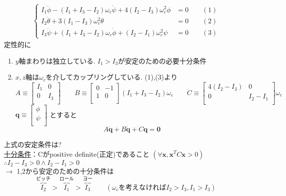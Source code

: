 \documentclass[class=article, crop=false, dvipdfmx, fleqn]{standalone}
\begin{document}
\begin{align}
\begin{cases}
I_1\ddot{\phi}
-(I_1+I_3-I_2)\omega_c\dot{\psi}
+4(I_2-I_3)\omega_c^2
\phi
&=0 \qquad(1)\\
I_2\ddot{\theta}
+3(I_1-I_3)\omega_c^2\theta
&=0 \qquad(2)\\
I_3\ddot{\psi}
+(I_1+I_3-I_2)\omega_c\dot{\phi}
+(I_2-I_1)\omega_c^2\psi
&=0\qquad(3)
\end{cases}
\end{align}
定性的に
\begin{enumerate}
\item $y$軸まわりは独立している.
$I_1 > I_3$が安定のための必要十分条件
\item $x,z$軸は$\omega_c$を介してカップリングしている.
(1),(3)より\\
\begin{equation}
A \equiv
\begin{bmatrix}
I_1 & 0\\
0 & I_3 \\
\end{bmatrix}
\qquad
B \equiv
\begin{bmatrix}
0 & -1\\
1 & 0\\
\end{bmatrix}
(I_1 + I_3 - I_2) \omega_c
\qquad
C \equiv
\begin{bmatrix}
4(I_2- I_3) & 0\\
0 & I_2 - I_1\\
\end{bmatrix}
\omega_c
\end{equation}
$\bm{q} \equiv
\begin{bmatrix}
\phi \\
\psi \\
\end{bmatrix}$
とすると
\begin{equation}
A \ddot{\bm{q}} + B \dot{\bm{q}} + C \bm{q} = \bm{0} 
\end{equation}
\end{enumerate}
上式の安定条件は?\\
\quad\underline{十分条件}：Cがpositive definite(正定)であること
$(\forall \bm{x}, \bm{x}^T C \bm{x} > 0)$ \\
$\therefore I_2 - I_3 >0\wedge I_2 - I_1 > 0$\\
$\rightarrow$ 1,2から安定のための十分条件は
\begin{equation}
\overbrace{I_2}^{\text{ピッチ}} 
>
\overbrace{I_1}^{\text{ロール}} > 
\overbrace{I_3}^{\text{ヨー}}\qquad
(\omega_c \text{を考えなければ}I_2 > I_3 , I_1 > I_3)
\end{equation}
\end{document}
